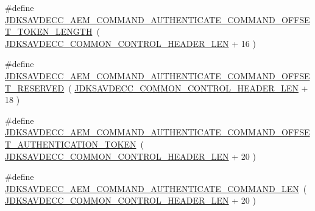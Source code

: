 \begin{DoxyCompactItemize}
\item 
\#define \hyperlink{group__command__authenticate_ga6dea4aaa99a318d656816c1f1fef5e3e}{J\+D\+K\+S\+A\+V\+D\+E\+C\+C\+\_\+\+A\+E\+M\+\_\+\+C\+O\+M\+M\+A\+N\+D\+\_\+\+A\+U\+T\+H\+E\+N\+T\+I\+C\+A\+T\+E\+\_\+\+C\+O\+M\+M\+A\+N\+D\+\_\+\+O\+F\+F\+S\+E\+T\+\_\+\+T\+O\+K\+E\+N\+\_\+\+L\+E\+N\+G\+TH}~( \hyperlink{group__jdksavdecc__avtp__common__control__header_gaae84052886fb1bb42f3bc5f85b741dff}{J\+D\+K\+S\+A\+V\+D\+E\+C\+C\+\_\+\+C\+O\+M\+M\+O\+N\+\_\+\+C\+O\+N\+T\+R\+O\+L\+\_\+\+H\+E\+A\+D\+E\+R\+\_\+\+L\+EN} + 16 )
\item 
\#define \hyperlink{group__command__authenticate_ga5e646c3fc47cf554add5ea6c886e2e09}{J\+D\+K\+S\+A\+V\+D\+E\+C\+C\+\_\+\+A\+E\+M\+\_\+\+C\+O\+M\+M\+A\+N\+D\+\_\+\+A\+U\+T\+H\+E\+N\+T\+I\+C\+A\+T\+E\+\_\+\+C\+O\+M\+M\+A\+N\+D\+\_\+\+O\+F\+F\+S\+E\+T\+\_\+\+R\+E\+S\+E\+R\+V\+ED}~( \hyperlink{group__jdksavdecc__avtp__common__control__header_gaae84052886fb1bb42f3bc5f85b741dff}{J\+D\+K\+S\+A\+V\+D\+E\+C\+C\+\_\+\+C\+O\+M\+M\+O\+N\+\_\+\+C\+O\+N\+T\+R\+O\+L\+\_\+\+H\+E\+A\+D\+E\+R\+\_\+\+L\+EN} + 18 )
\item 
\#define \hyperlink{group__command__authenticate_gab4e477e8a4d194dc54d3011ef68e98b5}{J\+D\+K\+S\+A\+V\+D\+E\+C\+C\+\_\+\+A\+E\+M\+\_\+\+C\+O\+M\+M\+A\+N\+D\+\_\+\+A\+U\+T\+H\+E\+N\+T\+I\+C\+A\+T\+E\+\_\+\+C\+O\+M\+M\+A\+N\+D\+\_\+\+O\+F\+F\+S\+E\+T\+\_\+\+A\+U\+T\+H\+E\+N\+T\+I\+C\+A\+T\+I\+O\+N\+\_\+\+T\+O\+K\+EN}~( \hyperlink{group__jdksavdecc__avtp__common__control__header_gaae84052886fb1bb42f3bc5f85b741dff}{J\+D\+K\+S\+A\+V\+D\+E\+C\+C\+\_\+\+C\+O\+M\+M\+O\+N\+\_\+\+C\+O\+N\+T\+R\+O\+L\+\_\+\+H\+E\+A\+D\+E\+R\+\_\+\+L\+EN} + 20 )
\item 
\#define \hyperlink{group__command__authenticate_ga4fc8006ff44cdde3e0c193973f0e4831}{J\+D\+K\+S\+A\+V\+D\+E\+C\+C\+\_\+\+A\+E\+M\+\_\+\+C\+O\+M\+M\+A\+N\+D\+\_\+\+A\+U\+T\+H\+E\+N\+T\+I\+C\+A\+T\+E\+\_\+\+C\+O\+M\+M\+A\+N\+D\+\_\+\+L\+EN}~( \hyperlink{group__jdksavdecc__avtp__common__control__header_gaae84052886fb1bb42f3bc5f85b741dff}{J\+D\+K\+S\+A\+V\+D\+E\+C\+C\+\_\+\+C\+O\+M\+M\+O\+N\+\_\+\+C\+O\+N\+T\+R\+O\+L\+\_\+\+H\+E\+A\+D\+E\+R\+\_\+\+L\+EN} + 20 )
\end{DoxyCompactItemize}
